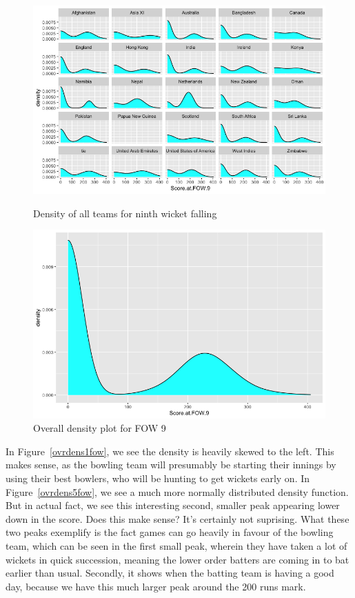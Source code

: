 \begin{figure}
    \centering
    \begin{minipage}{0.4\textwidth}
        \centering
        \includegraphics[scale=0.28]{figures/fow9density.png}
        \caption{Density of all teams for ninth wicket falling}
        \label{alldens9fow}
    \end{minipage}
    \begin{minipage}{0.4\textwidth}
        \centering
        \includegraphics[scale=0.28]{figures/fow9densfull.png}
        \caption{Overall density plot for FOW 9}
        \label{ovrdens9fow}
    \end{minipage}
\end{figure}

In Figure~\ref{ovrdens1fow}, we see the density is heavily skewed to the left. This makes sense, as the bowling team will presumably be starting 
their innings by using their best bowlers, who will be hunting to get wickets early on. In Figure~\ref{ovrdens5fow}, we see a much more normally distributed
density function. But in actual fact, we see this interesting second, smaller peak appearing lower down in the score. Does this make sense? It's certainly 
not suprising. What these two peaks exemplify is the fact games can go heavily in favour of the bowling team, which can be seen in the first small peak,
wherein they have taken a lot of wickets in quick succession, meaning the lower order batters are coming in to bat earlier than usual. Secondly, it shows when the 
batting team is having a good day, because we have this much larger peak around the 200 runs mark.\\

